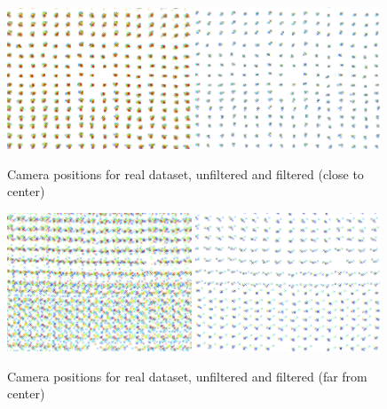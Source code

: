 \documentclass[11pt]{scrreprt}
\begin{document}
\begin{figure}[p]
\centering

\includegraphics[width=0.49\textwidth]{rcpos_real_cent.pdf}
\includegraphics[width=0.49\textwidth]{rcpos_real_cent_f.pdf}
\caption{Camera positions for real dataset, unfiltered and filtered (close to center)}
\label{fig:rcpos_real_cent}
\vspace{1cm}

\includegraphics[width=0.49\textwidth]{rcpos_real_far.pdf}
\includegraphics[width=0.49\textwidth]{rcpos_real_far_f.pdf}
\caption{Camera positions for real dataset, unfiltered and filtered (far from center)}
\label{fig:rcpos_real_far}
\vspace{1cm}


\end{figure}
\end{document}
